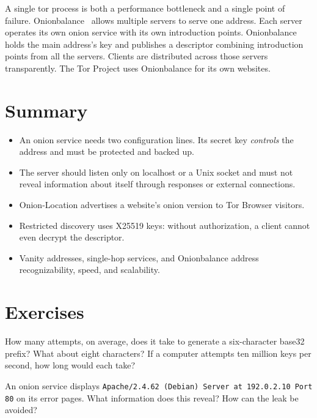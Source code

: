 A single tor process is both a performance bottleneck and a single point of failure. Onionbalance~\cite{onionbalance} allows multiple servers to serve one address. Each server operates its own onion service with its own introduction points. Onionbalance holds the main address's key and publishes a descriptor combining introduction points from all the servers. Clients are distributed across those servers transparently. The Tor Project uses Onionbalance for its own websites.

\section*{Summary}
\begin{itemize}
  \item An onion service needs two configuration lines. Its secret key \emph{controls} the address and must be protected and backed up.
  \item The server should listen only on localhost or a Unix socket and must not reveal information about itself through responses or external connections.
  \item Onion-Location advertises a website's onion version to Tor Browser visitors.
  \item Restricted discovery uses X25519 keys: without authorization, a client cannot even decrypt the descriptor.
  \item Vanity addresses, single-hop services, and Onionbalance address recognizability, speed, and scalability.
\end{itemize}

\section*{Exercises}

\begin{esercizio}[1]\label{es:21-vanity}
How many attempts, on average, does it take to generate a six-character base32 prefix? What about eight characters? If a computer attempts ten million keys per second, how long would each take?
\end{esercizio}

\begin{esercizio}[2]\label{es:21-fuga}
An onion service displays \texttt{Apache/2.4.62 (Debian) Server at 192.0.2.10 Port 80} on its error pages. What information does this reveal? How can the leak be avoided?
\end{esercizio}


